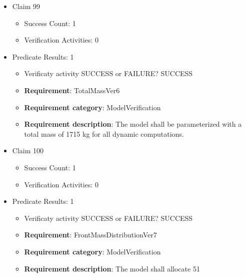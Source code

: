 \documentclass{article}
\begin{document}
\begin{itemize}
\begin{itemize}
					\item \textbf{Requirement}: CommunicationFrequencyVer5 
					\item \textbf{Requirement category}: ModelVerification
					\item \textbf{Requirement description}: The model shall update and transmit its state variables, forces, and kinematic outputs at a fixed rate of 100 Hz.
					\end{itemize}

  				  \item Claim 99
				\begin{itemize}
			    	\item Success Count: 1 
			    	\item Verification Activities: 0
				\end{itemize}
				
									    
				\item Predicate Results: 1
					\begin{itemize}				
					\item Verificaty activity SUCCESS or FAILURE? SUCCESS
					
					\item \textbf{Requirement}: TotalMassVer6 
					\item \textbf{Requirement category}: ModelVerification
					\item \textbf{Requirement description}: The model shall be parameterized with a total mass of 1715 kg for all dynamic computations.
					\end{itemize}

  				  \item Claim 100
				\begin{itemize}
			    	\item Success Count: 1 
			    	\item Verification Activities: 0
				\end{itemize}
				
									    
				\item Predicate Results: 1
					\begin{itemize}				
					\item Verificaty activity SUCCESS or FAILURE? SUCCESS
					
					\item \textbf{Requirement}: FrontMassDistributionVer7 
					\item \textbf{Requirement category}: ModelVerification
					\item \textbf{Requirement description}: The model shall allocate 51%
					\end{itemize}


\end{itemize}
\end{document}

